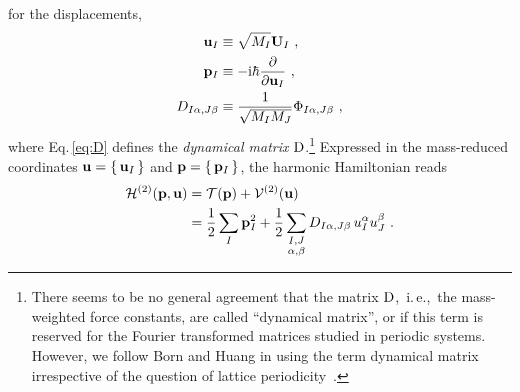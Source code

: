  for the displacements,
\begin{align}
	{\bf u}_I 
		&\equiv \sqrt{M_I} {\bf U}_I~, 
		\label{eq:uI} \\
	{\bf p}_I 
		&\equiv -\im \hbar \frac{\partial}{\partial {\bf u}_I}~,
		\label{eq:pI} \\
	D_{I \alpha, J \beta}
		&\equiv \frac{1}{\sqrt{M_I M_J}} 
		\Phi_{I \alpha, J \beta}~,
		\label{eq:D}
\end{align}
where Eq.\,\eqref{eq:D} defines the \emph{dynamical matrix} $\rm D$.\footnote{There seems to be no general agreement that the matrix $\rm D$,~i.\,e.,~the mass-weighted force constants, are called ``dynamical matrix'', or if this term is reserved for the Fourier transformed matrices studied in periodic systems. However, we follow Born and Huang in using the term dynamical matrix irrespective of the question of lattice periodicity~\cite[p.\,173]{BornHuang}.}
Expressed in the mass-reduced coordinates ${\bf u} = \set{{\bf u}_I}$ and ${\bf p} = \set{{\bf p}_I}$, the harmonic Hamiltonian reads
\begin{align}
	\begin{split}
		\mathcal{H}^{(2)}({\bf p}, {\bf u})
			&= \mathcal T ({\bf p}) + \mathcal{V}^{(2)} ({\bf u})\\
			&= \halb \sum_I {\bf p}_I^2 + 
				\halb \sum_{\substack{I, J \\ \alpha, \beta}}
					D_{I \alpha, J \beta}
					\, u_I^\alpha u_J^\beta~.
	\end{split}
	\label{eq:ha.H1}
\end{align}

